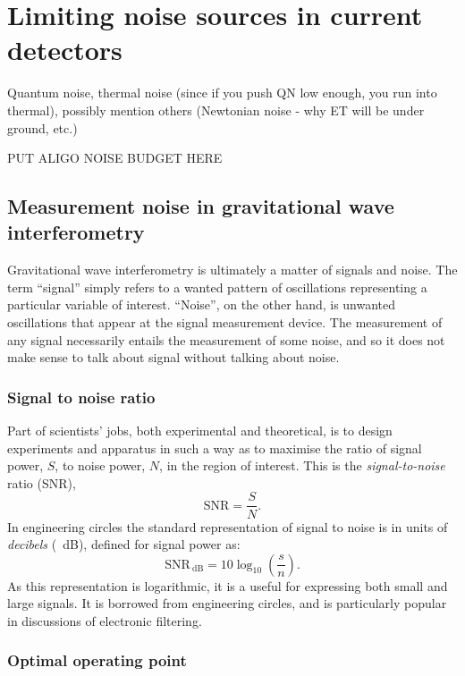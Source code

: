\section{Limiting noise sources in current detectors}
Quantum noise, thermal noise (since if you push QN low enough, you run into thermal), possibly mention others (Newtonian noise - why ET will be under ground, etc.)

PUT ALIGO NOISE BUDGET HERE

\subsection{Measurement noise in gravitational wave interferometry}
Gravitational wave interferometry is ultimately a matter of signals and noise. The term ``signal'' simply refers to a wanted pattern of oscillations representing a particular variable of interest. ``Noise'', on the other hand, is unwanted oscillations that appear at the signal measurement device. The measurement of any signal necessarily entails the measurement of some noise, and so it does not make sense to talk about signal without talking about noise.

\subsubsection{\label{sec:snr}Signal to noise ratio}

Part of scientists' jobs, both experimental and theoretical, is to design experiments and apparatus in such a way as to maximise the ratio of signal power, $S$, to noise power, $N$, in the region of interest. This is the \emph{signal-to-noise} ratio (SNR),
\begin{equation}
  \text{SNR} = \frac{S}{N}.
\end{equation}
In engineering circles the standard representation of signal to noise is in units of \emph{decibels} (\SI{}{\deci\bel}), defined for signal power as:
\begin{equation}
  \text{SNR}_{\SI{}{\deci\bel}} = 10 \log_{10} \left( \frac{s}{n} \right).
\end{equation}
As this representation is logarithmic, it is a useful for expressing both small and large signals. It is borrowed from engineering circles, and is particularly popular in discussions of electronic filtering.

\subsubsection{Optimal operating point}

